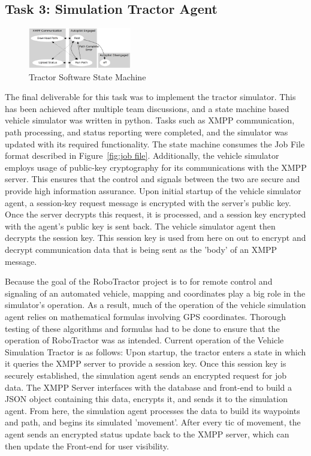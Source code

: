 \documentclass[conference,12pt]{IEEEtran}
\begin{document}
\subsection{Task 3: Simulation Tractor Agent}

\begin{figure}
\centering
\includegraphics[width=0.4\textwidth]{Images/machine.png}
\caption{Tractor Software State Machine}
\label{fig:tractorstatemachine}
\end{figure}
The final deliverable for this task was to implement the tractor simulator. This has been achieved after multiple team discussions, and a state machine based vehicle simulator was written in python. Tasks such as XMPP communication, path processing, and status reporting were completed, and the simulator was updated with its required functionality. The state machine consumes the Job File format described in Figure~\ref{fig:job file}. Additionally, the vehicle simulator employs usage of public-key cryptography for its communications with the XMPP server. This ensures that the control and signals between the two are secure and provide high information assurance. Upon initial startup of the vehicle simulator agent, a session-key request message is encrypted with the server's public key. Once the server decrypts this request, it is processed, and a session key encrypted with the agent's public key is sent back. The vehicle simulator agent then decrypts the session key. This session key is used from here on out to encrypt and decrypt communication data that is being sent as the 'body' of an XMPP message. 

Because the goal of the RoboTractor project is to for remote control and signaling of an automated vehicle, mapping and coordinates play a big role in the simulator's operation. As a result, much of the operation of the vehicle simulation agent relies on mathematical formulas involving GPS coordinates. Thorough testing of these algorithms and formulas had to be done to ensure that the operation of RoboTractor was as intended. Current operation of the Vehicle Simulation Tractor is as follows: Upon startup, the tractor enters a state in which it queries the XMPP server to provide a session key. Once this session key is securely established, the simulation agent sends an encrypted request for job data. The XMPP Server interfaces with the database and front-end to build a JSON object containing this data, encrypts it, and sends it to the simulation agent. From here, the simulation agent processes the data to build its waypoints and path, and begins its simulated 'movement'. After every tic of movement, the agent sends an encrypted status update back to the XMPP server, which can then update the Front-end for user visibility. 
\end{document}
